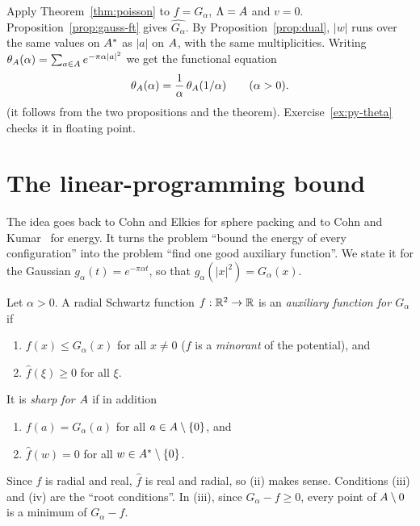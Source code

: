 \begin{example}\label{ex:theta}
Apply Theorem~\ref{thm:poisson} to $f=G_\alpha$, $\Lambda=A$ and $v=0$. Proposition~\ref{prop:gauss-ft} gives
$\widehat{G_\alpha}$. By Proposition~\ref{prop:dual}, $|w|$ runs over the same values on $A^*$ as $|a|$ on $A$, with
the same multiplicities. Writing $\theta_A(\alpha)=\sum_{a\in A}e^{-\pi\alpha|a|^2}$ we get the functional equation
\[
  \theta_A(\alpha)=\frac1\alpha\,\theta_A(1/\alpha)\qquad(\alpha>0).
\]
\tierC{} (it follows from the two propositions and the theorem). Exercise~\ref{ex:py-theta} checks it in floating
point.
\end{example}

\section{The linear-programming bound}
\label{sec:lp}

The idea goes back to Cohn and Elkies for sphere packing and to Cohn and Kumar~\cite{ck} for energy. It turns the
problem ``bound the energy of every configuration'' into the problem ``find one good auxiliary function''. We state it
for the Gaussian $g_\alpha(t)=e^{-\pi\alpha t}$, so that $g_\alpha(|x|^2)=G_\alpha(x)$.

\begin{definition}\label{def:aux}
Let $\alpha>0$. A radial Schwartz function $f:\mathbb{R}^2\to\mathbb{R}$ is an \emph{auxiliary function for $G_\alpha$} if
\begin{enumerate}
\item[(i)] $f(x)\le G_\alpha(x)$ for all $x\ne0$ ($f$ is a \emph{minorant} of the potential), and
\item[(ii)] $\widehat f(\xi)\ge0$ for all $\xi$.
\end{enumerate}
It is \emph{sharp for $A$} if in addition
\begin{enumerate}
\item[(iii)] $f(a)=G_\alpha(a)$ for all $a\in A\setminus\{0\}$, and
\item[(iv)] $\widehat f(w)=0$ for all $w\in A^*\setminus\{0\}$.
\end{enumerate}
\end{definition}

Since $f$ is radial and real, $\widehat f$ is real and radial, so (ii) makes sense. Conditions (iii) and (iv) are the
``root conditions''. In (iii), since $G_\alpha-f\ge0$, every point of $A\setminus0$ is a minimum of $G_\alpha-f$.

